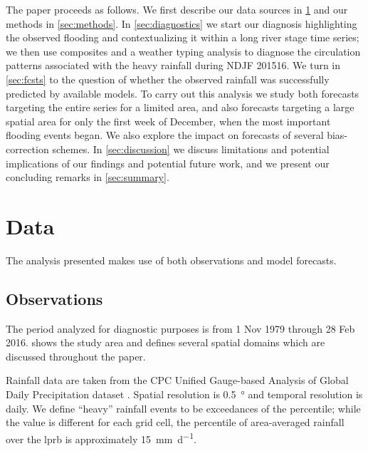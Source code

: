 \documentclass{ametsoc}
\begin{document}
The paper proceeds as follows.
We first describe our data sources in \cref{sec:data} and our methods in \cref{sec:methods}.
In \cref{sec:diagnostics} we start our diagnosis highlighting the observed flooding and contextualizing it within a long river stage time series; we then use composites and a weather typing analysis to diagnose the circulation patterns associated with the heavy rainfall during NDJF 201516.
We turn in \cref{sec:fcsts} to the question of whether the observed rainfall was successfully predicted by available models.
To carry out this analysis we study both forecasts targeting the entire series for a limited area, and also forecasts targeting a large spatial area for only the first week of December, when the most important flooding events began.
We also explore the impact on forecasts of several bias-correction schemes.
In \cref{sec:discussion} we discuss limitations and potential implications of our findings and potential future work, and we present our concluding remarks in \cref{sec:summary}.


\section{Data}\label{sec:data}

The analysis presented makes use of both observations and model forecasts.

\subsection{Observations}

The period analyzed for diagnostic purposes is from 1 Nov 1979 through 28 Feb 2016.
 shows the study area and defines several spatial domains which are discussed throughout the paper.

Rainfall data are taken from the CPC Unified Gauge-based Analysis of Global Daily Precipitation dataset \citep{Chen2008}.
Spatial resolution is \SI{0.5}{\degree} and temporal resolution is daily.
We define ``heavy'' rainfall events to be exceedances of the  percentile; while the value is different for each grid cell, the  percentile of area-averaged rainfall over the \gls{lprb} is approximately \SI{15}{\milli\meter\per\day}.
\end{document}
